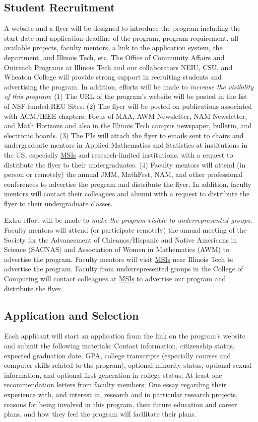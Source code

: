 \documentclass[11pt]{NSFamsart}
\newcommand{\MSIs}{\hyperlink{MSIlink}{MSIs}\xspace}
\begin{document}
\subsection{Student Recruitment} A website and a flyer will be designed to introduce the program including the start date and application deadline of the program, program requirement,  
all available projects, faculty mentors, a link to the application system, the department, and Illinois Tech, etc. The Office of Community Affairs and Outreach Programs at Illinois Tech and our collaborators NEIU, CSU, and Wheaton College  will provide strong support in recruiting students and advertising the program. In addition,
efforts will be made to 
\emph{increase the visibility of this program}: 
(1) 
The URL of the program’s
website \cite{SUREWeb} will be posted in the list of NSF-funded REU Sites. 
(2) The flyer will be posted on publications associated with ACM/IEEE chapters, Focus of MAA, AWM
Newsletter, NAM Newsletter, and Math Horizons and also in the Illinois Tech campus newspaper, bulletin, and electronic boards.
(3) 
The PIs will attach the flyer to emails sent to
chairs and undergraduate mentors in Applied Mathematics and Statistics at institutions in the US, especially
\MSIs and research-limited institutions, with a request to distribute the flyer to their undergraduates. 
(4) Faculty mentors will attend (in person or remotely)
the annual JMM, MathFest, NAM, and other professional conferences to advertise the
program and distribute the flyer. In addition, faculty mentors will contact their colleagues and alumni with a request to
distribute the flyer to their undergraduate classes.

Extra effort will be made to 
\emph{make the program visible to underrepresented groups}.
Faculty mentors will attend (or participate remotely) the annual meeting of the Society for the Advancement of Chicanos/Hispanic and Native Americans in Science  (SACNAS) and Association of Women in Mathematics (AWM)
to advertise the program.
Faculty mentors will visit 
\MSIs near Illinois Tech to advertise the program.
 Faculty from underrepresented groups in the College of Computing will contact colleagues at \MSIs to advertise our
 program and distribute the flyer.
 

\subsection{Application and Selection} Each applicant will start an application from the link on the program’s
website and submit the following materials: 
Contact information, citizenship status, expected graduation date, GPA, college transcripts (especially courses and computer skills related to the program),
optional minority status, optional sexual information, and optional first-generation-in-college status;
At least one recommendation
letters from faculty members; 
One essay regarding their experience with, and interest in, research and in particular research projects, reasons for being involved in this program, their future
education and career plans, and how they feel the program will facilitate their plans. 
\end{document}
